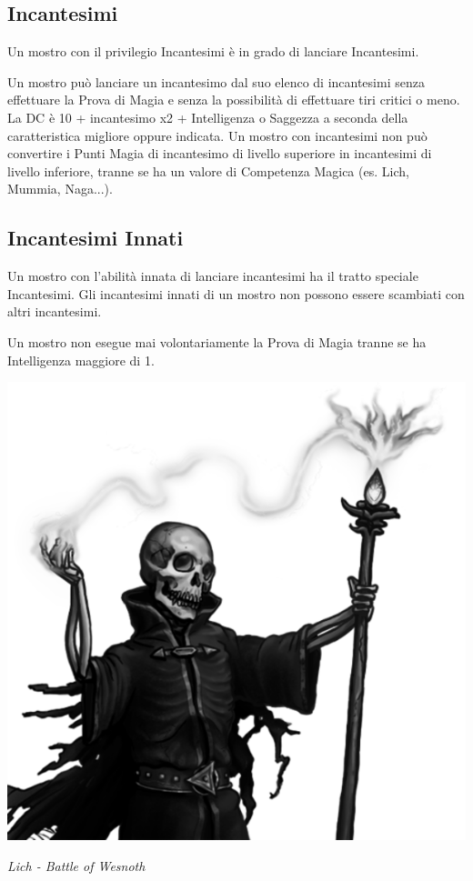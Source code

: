\begin{multicols}{2}
	\subsection{Incantesimi}

	Un mostro con il privilegio Incantesimi è in grado di lanciare Incantesimi.

	Un mostro può lanciare un incantesimo dal suo elenco di incantesimi senza effettuare la Prova di Magia e senza la possibilità di effettuare tiri critici o meno. La DC è 10 + incantesimo x2 + Intelligenza o Saggezza a seconda della caratteristica migliore oppure indicata. Un mostro con incantesimi non può convertire i Punti Magia di incantesimo di livello superiore in incantesimi di livello inferiore, tranne se ha un valore di Competenza Magica (es. Lich, Mummia, Naga...).

	\subsection{Incantesimi Innati}

	Un mostro con l'abilità innata di lanciare incantesimi ha il tratto speciale Incantesimi.
	Gli incantesimi innati di un mostro non possono essere scambiati con altri incantesimi.

	Un mostro non esegue mai volontariamente la Prova di Magia tranne se ha Intelligenza maggiore di 1.


	\begin{center}
		\includegraphics[width=0.7\linewidth]{immagini/lich2.png}

		\textit{Lich - Battle of Wesnoth}

	\end{center}



\end{multicols}
